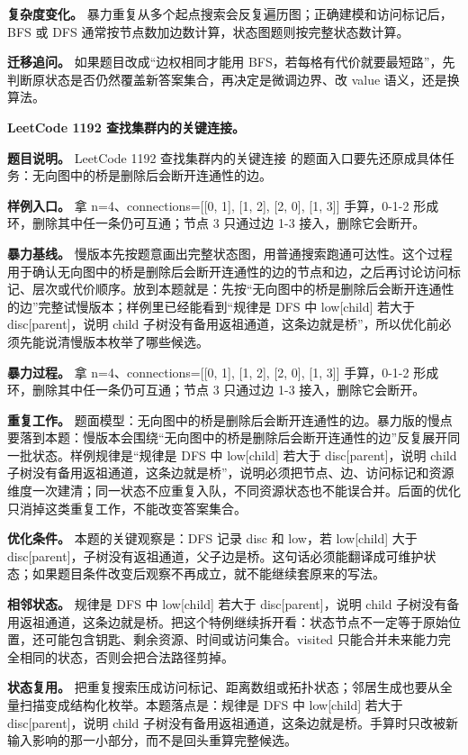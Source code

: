 \textbf{复杂度变化。} 暴力重复从多个起点搜索会反复遍历图；正确建模和访问标记后，BFS 或 DFS 通常按节点数加边数计算，状态图题则按完整状态数计算。

\textbf{迁移追问。} 如果题目改成“边权相同才能用 BFS，若每格有代价就要最短路”，先判断原状态是否仍然覆盖新答案集合，再决定是微调边界、改 value 语义，还是换算法。

\noindent\textbf{LeetCode 1192 查找集群内的关键连接。}

\textbf{题目说明。} LeetCode 1192 查找集群内的关键连接 的题面入口要先还原成具体任务：无向图中的桥是删除后会断开连通性的边。

\textbf{样例入口。} 拿 n=4、connections=[[0, 1], [1, 2], [2, 0], [1, 3]] 手算，0-1-2 形成环，删除其中任一条仍可互通；节点 3 只通过边 1-3 接入，删除它会断开。

\textbf{暴力基线。} 慢版本先按题意画出完整状态图，用普通搜索跑通可达性。这个过程用于确认无向图中的桥是删除后会断开连通性的边的节点和边，之后再讨论访问标记、层次或代价顺序。放到本题就是：先按“无向图中的桥是删除后会断开连通性的边”完整试慢版本；样例里已经能看到“规律是 DFS 中 low[child] 若大于 disc[parent]，说明 child 子树没有备用返祖通道，这条边就是桥”，所以优化前必须先能说清慢版本枚举了哪些候选。

\textbf{暴力过程。} 拿 n=4、connections=[[0, 1], [1, 2], [2, 0], [1, 3]] 手算，0-1-2 形成环，删除其中任一条仍可互通；节点 3 只通过边 1-3 接入，删除它会断开。

\textbf{重复工作。} 题面模型：无向图中的桥是删除后会断开连通性的边。暴力版的慢点要落到本题：慢版本会围绕“无向图中的桥是删除后会断开连通性的边”反复展开同一批状态。样例规律是“规律是 DFS 中 low[child] 若大于 disc[parent]，说明 child 子树没有备用返祖通道，这条边就是桥”，说明必须把节点、边、访问标记和资源维度一次建清；同一状态不应重复入队，不同资源状态也不能误合并。后面的优化只消掉这类重复工作，不能改变答案集合。

\textbf{优化条件。} 本题的关键观察是：DFS 记录 disc 和 low，若 low[child] 大于 disc[parent]，子树没有返祖通道，父子边是桥。这句话必须能翻译成可维护状态；如果题目条件改变后观察不再成立，就不能继续套原来的写法。

\textbf{相邻状态。} 规律是 DFS 中 low[child] 若大于 disc[parent]，说明 child 子树没有备用返祖通道，这条边就是桥。把这个特例继续拆开看：状态节点不一定等于原始位置，还可能包含钥匙、剩余资源、时间或访问集合。visited 只能合并未来能力完全相同的状态，否则会把合法路径剪掉。

\textbf{状态复用。} 把重复搜索压成访问标记、距离数组或拓扑状态；邻居生成也要从全量扫描变成结构化枚举。本题落点是：规律是 DFS 中 low[child] 若大于 disc[parent]，说明 child 子树没有备用返祖通道，这条边就是桥。手算时只改被新输入影响的那一小部分，而不是回头重算完整候选。

